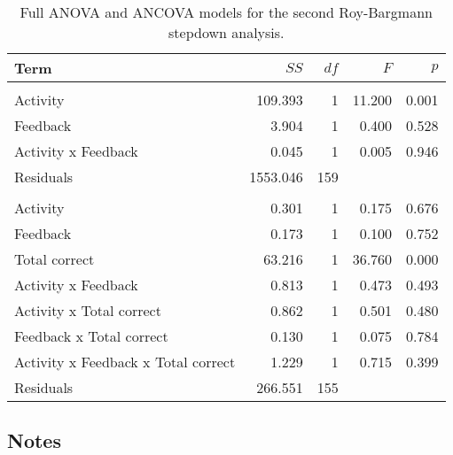 \documentclass[11pt,]{article}
\begin{document}
\begin{table*}[t]

\caption{\label{tab:rb2Table}Full ANOVA and ANCOVA models for the second Roy-Bargmann
                     stepdown analysis.}
\centering
\begin{tabular}{lrrrr}
\toprule
Term & $SS$ & $df$ & $F$ & $p$\\
\midrule
\addlinespace[0.3em]
\multicolumn{5}{l}{\textbf{ANOVA}}\\
\hspace{1em}Activity & 109.393 & 1 & 11.200 & 0.001\\
\hspace{1em}Feedback & 3.904 & 1 & 0.400 & 0.528\\
\hspace{1em}Activity x Feedback & 0.045 & 1 & 0.005 & 0.946\\
\hspace{1em}Residuals & 1553.046 & 159 &  & \\
\addlinespace[0.3em]
\multicolumn{5}{l}{\textbf{ANCOVA}}\\
\hspace{1em}Activity & 0.301 & 1 & 0.175 & 0.676\\
\hspace{1em}Feedback & 0.173 & 1 & 0.100 & 0.752\\
\hspace{1em}Total correct & 63.216 & 1 & 36.760 & 0.000\\
\hspace{1em}Activity x Feedback & 0.813 & 1 & 0.473 & 0.493\\
\hspace{1em}Activity x Total correct & 0.862 & 1 & 0.501 & 0.480\\
\hspace{1em}Feedback x Total correct & 0.130 & 1 & 0.075 & 0.784\\
\hspace{1em}Activity x Feedback x Total correct & 1.229 & 1 & 0.715 & 0.399\\
\hspace{1em}Residuals & 266.551 & 155 &  & \\
\bottomrule
\end{tabular}
\end{table*}

\hypertarget{notes}{%
\subsection{Notes}\label{notes}}
\end{document}
